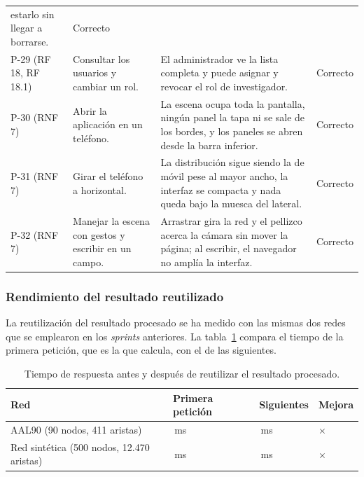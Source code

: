 \begin{table}[H]
\begin{tabularx}{\textwidth}{>{\raggedright\arraybackslash}p{1.7cm} >{\raggedright\arraybackslash}X >{\raggedright\arraybackslash}X >{\centering\arraybackslash}p{1.6cm}}
			estarlo sin llegar a borrarse. & Correcto \\
		\addlinespace
		P-29 (RF 18, RF 18.1) & Consultar los usuarios y cambiar un rol. &
			El administrador ve la lista completa y puede asignar y revocar el rol de
			investigador. & Correcto \\
		\addlinespace
		P-30 (RNF 7) & Abrir la aplicación en un teléfono. &
			La escena ocupa toda la pantalla, ningún panel la tapa ni se sale de los bordes, y los
			paneles se abren desde la barra inferior. & Correcto \\
		\addlinespace
		P-31 (RNF 7) & Girar el teléfono a horizontal. &
			La distribución sigue siendo la de móvil pese al mayor ancho, la interfaz se compacta y
			nada queda bajo la muesca del lateral. & Correcto \\
		\addlinespace
		P-32 (RNF 7) & Manejar la escena con gestos y escribir en un campo. &
			Arrastrar gira la red y el pellizco acerca la cámara sin mover la página; al escribir, el
			navegador no amplía la interfaz. & Correcto \\
		\bottomrule
	\end{tabularx}
\end{table}

\subsubsection*{Rendimiento del resultado reutilizado}

La reutilización del resultado procesado se ha medido con las mismas dos redes que se emplearon en
los \textit{sprints} anteriores. La tabla~\ref{tab:cache} compara el tiempo de la primera petición,
que es la que calcula, con el de las siguientes.

\begin{table}[H]
	\centering
	\caption{Tiempo de respuesta antes y después de reutilizar el resultado procesado.}
	\label{tab:cache}
	\small
	\begin{tabularx}{\textwidth}{>{\raggedright\arraybackslash}X >{\centering\arraybackslash}p{2.4cm} >{\centering\arraybackslash}p{2.4cm} >{\centering\arraybackslash}p{2.2cm}}
		\toprule
		\textbf{Red} & \textbf{Primera petición} & \textbf{Siguientes} & \textbf{Mejora} \\
		\midrule
		AAL90 (90 nodos, 411 aristas)          & 12\,ms  & 4\,ms & 3$\times$   \\
		Red sintética (500 nodos, 12.470 aristas) & 652\,ms & 4\,ms & 147$\times$ \\
		\bottomrule
	\end{tabularx}
\end{table}

